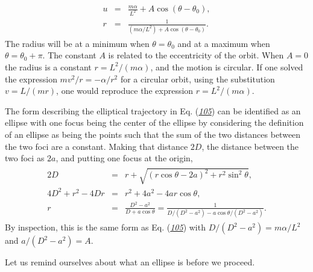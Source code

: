\documentclass[letterpaper,10pt,english]{sphinxmanual}
\begin{document}
\begin{equation*}
\begin{split}
\begin{eqnarray}
\label{eq:Ctrajectory} \tag{105}
u&=&\frac{m\alpha}{L^2}+A\cos(\theta-\theta_0),\\
\nonumber
r&=&\frac{1}{(m\alpha/L^2)+A\cos(\theta-\theta_0)}.
\end{eqnarray}
\end{split}
\end{equation*}
The radius will be at a minimum when \(\theta=\theta_0\) and at a
maximum when \(\theta=\theta_0+\pi\). The constant \(A\) is related to the
eccentricity of the orbit. When \(A=0\) the radius is a constant
\(r=L^2/(m\alpha)\), and the motion is circular. If one solved the
expression \(mv^2/r=-\alpha/r^2\) for a circular orbit, using the
substitution \(v=L/(mr)\), one would reproduce the expression
\(r=L^2/(m\alpha)\).

The form describing the elliptical trajectory in
Eq. ({\hyperref[\detokenize{chapter1:eq:Ctrajectory}]{\emph{105}}}) can be identified as an ellipse with one
focus being the center of the ellipse by considering the definition of
an ellipse as being the points such that the sum of the two distances
between the two foci are a constant. Making that distance \(2D\), the
distance between the two foci as \(2a\), and putting one focus at the
origin,
\begin{equation*}
\begin{split}
\begin{eqnarray}
2D&=&r+\sqrt{(r\cos\theta-2a)^2+r^2\sin^2\theta},\\
\nonumber
4D^2+r^2-4Dr&=&r^2+4a^2-4ar\cos\theta,\\
\nonumber
r&=&\frac{D^2-a^2}{D+a\cos\theta}=\frac{1}{D/(D^2-a^2)-a\cos\theta/(D^2-a^2)}.
\end{eqnarray}
\end{split}
\end{equation*}
By inspection, this is the same form as Eq. ({\hyperref[\detokenize{chapter1:eq:Ctrajectory}]{\emph{105}}}) with \(D/(D^2-a^2)=m\alpha/L^2\) and \(a/(D^2-a^2)=A\).

Let us remind ourselves about what an ellipse is before we proceed.
\end{document}
